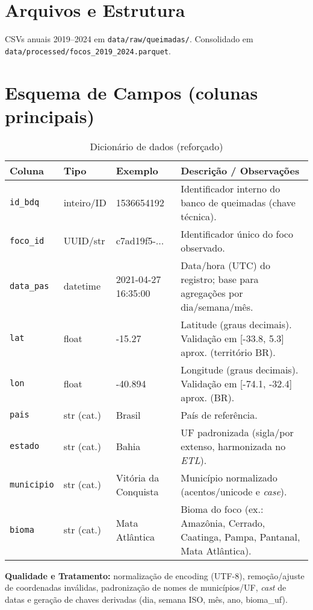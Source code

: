 \documentclass[12pt,a4paper]{report}
\begin{document}
\section{Arquivos e Estrutura}
CSVs anuais 2019--2024 em \texttt{data/raw/queimadas/}. Consolidado em \texttt{data/processed/focos\_2019\_2024.parquet}.

\section{Esquema de Campos (colunas principais)}
\begin{table}[h]
\centering
\caption{Dicionário de dados (reforçado)}
\label{tab:dicionario}
\begin{tabular}{p{3.2cm} p{3cm} p{3.5cm} p{6.5cm}}
\toprule
\textbf{Coluna} & \textbf{Tipo} & \textbf{Exemplo} & \textbf{Descrição / Observações}\\
\midrule
\texttt{id\_bdq} & inteiro/ID & 1536654192 & Identificador interno do banco de queimadas (chave técnica).\\
\texttt{foco\_id} & UUID/str & c7ad19f5-... & Identificador único do foco observado.\\
\texttt{data\_pas} & datetime & 2021-04-27 16:35:00 & Data/hora (UTC) do registro; base para agregações por dia/semana/mês.\\
\texttt{lat} & float & -15.27 & Latitude (graus decimais). Validação em [-33.8, 5.3] aprox. (território BR).\\
\texttt{lon} & float & -40.894 & Longitude (graus decimais). Validação em [-74.1, -32.4] aprox. (BR).\\
\texttt{pais} & str (cat.) & Brasil & País de referência.\\
\texttt{estado} & str (cat.) & Bahia & UF padronizada (sigla/por extenso, harmonizada no \textit{ETL}).\\
\texttt{municipio} & str (cat.) & Vitória da Conquista & Município normalizado (acentos/unicode e \textit{case}).\\
\texttt{bioma} & str (cat.) & Mata Atlântica & Bioma do foco (ex.: Amazônia, Cerrado, Caatinga, Pampa, Pantanal, Mata Atlântica).\\
\bottomrule
\end{tabular}
\end{table}

\noindent\textbf{Qualidade e Tratamento:} normalização de encoding (UTF-8), remoção/ajuste de coordenadas inválidas, padronização de nomes de municípios/UF, \textit{cast} de datas e geração de chaves derivadas (dia, semana ISO, mês, ano, bioma\_uf).
\end{document}
